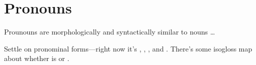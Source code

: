 \section{Pronouns}
Prounouns are morphologically and syntactically similar to nouns \dots

\begin{kaobox}[frametitle=\sc todo:]
Settle on pronominal forms---right now it's  ,  ,  , and  . There's some isogloss map about whether  is  or .
\end{kaobox}